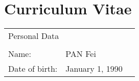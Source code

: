
\chapter{Curriculum Vitae}

\begin{table}[H]
\setlength{\tabcolsep}{0pt}
\begin{tabular}{lll}
\multicolumn{3}{l}{Personal Data}                                               \\
                &                                &                              \\
Name:           & PAN Fei                        &                              \\
Date of birth:  & January 1, 1990                &                              \\
\end{tabular}
\end{table} 